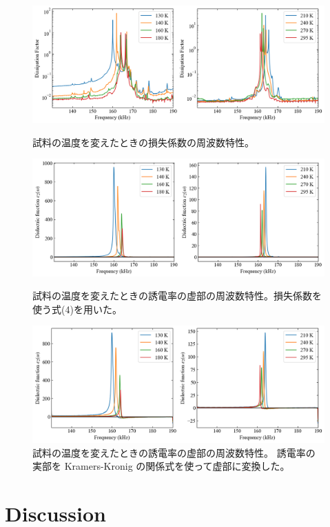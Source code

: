 \documentclass[9pt,dvipdfmx,a4paper]{jsarticle}
\begin{document}
\begin{figure}[p]
    \includegraphics[width=0.96\columnwidth]{Dissipation-f.png}
    \caption{試料の温度を変えたときの損失係数の周波数特性。}
    \label{graph:Dissipation-f}
    \includegraphics[width=0.96\columnwidth]{epsilon2-f_EpD.png}
    \caption{試料の温度を変えたときの誘電率の虚部の周波数特性。損失係数を使う式(4)を用いた。}
    \label{graph:epsilon2-f_D}
    \includegraphics[width=0.96\columnwidth]{epsilon2-f_KK.png}
    \caption{試料の温度を変えたときの誘電率の虚部の周波数特性。
    誘電率の実部を Kramers-Kronig の関係式を使って虚部に変換した。}
    \label{graph:epsilon2-f_KK}
\end{figure}

\section{Discussion}
\end{document}
